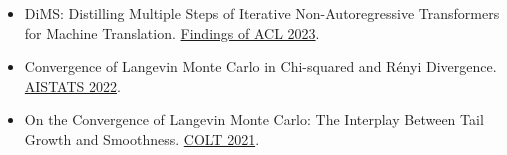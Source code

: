 \documentclass[11pt,a4paper]{article}
\begin{document}
\begin{itemize}[noitemsep, topsep=4pt, leftmargin=0em, label=\textcolor{maincolorlight}{$\circ$}]
    \item DiMS: Distilling Multiple Steps of Iterative Non-Autoregressive Transformers for Machine Translation. {\textcolor{venuecolor}{\href{https://aclanthology.org/2023.findings-acl.542}{Findings of ACL 2023}}}.
    \item Convergence of Langevin Monte Carlo in Chi-squared and R\'enyi Divergence. {\textcolor{venuecolor}{\href{https://proceedings.mlr.press/v151/erdogdu22a.html}{AISTATS 2022}}}.
    \item On the Convergence of Langevin Monte Carlo: The Interplay Between Tail Growth and Smoothness. {\textcolor{venuecolor}{\href{https://proceedings.mlr.press/v134/erdogdu21a.html}{COLT 2021}}}.
\end{itemize}
\end{document}
